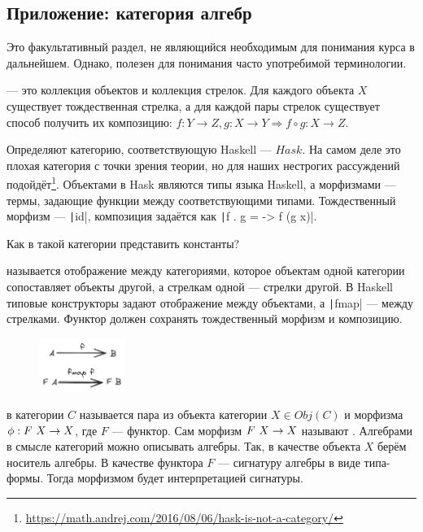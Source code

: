 \subsection{Приложение: категория алгебр} \label{subsec:cats}

Это факультативный раздел, не являющийся необходимым для понимания курса в дальнейшем.
Однако, полезен для понимания часто употребимой терминологии.

 --- это коллекция объектов и коллекция стрелок.
Для каждого объекта $X$ существует тождественная стрелка, а для каждой пары стрелок существует способ получить их композицию: $f : Y \to Z, g : X \to Y \Rightarrow f \circ g : X \to Z$.

Определяют категорию, соответствующую Haskell --- $Hask$.
На самом деле это плохая категория с точки зрения теории, но для наших нестрогих рассуждений подойдёт\footnote{\url{https://math.andrej.com/2016/08/06/hask-is-not-a-category/}}.
Объектами в Hask являются типы языка Haskell, а морфизмами --- термы, задающие функции между соответствующими типами.
Тождественный морфизм --- \texttt|id|, композиция задаётся как \texttt|f . g = \x -> f (g x)|.

\begin{task}
    Как в такой категории представить константы?
\end{task}

 называется отображение между категориями, которое объектам одной категории сопоставляет объекты другой, а стрелкам одной --- стрелки другой.
В Haskell типовые конструкторы задают отображение между объектами, а \texttt|fmap| --- между стрелками.
Функтор должен сохранять тождественный морфизм и композицию.
\begin{figure}[h!]
    \centering
    \includegraphics[width=0.25\textwidth]{figs/functor}
\end{figure}

 в категории $C$ называется пара из объекта категории $X \in Obj(C)$ и морфизма $\phi : F~ X \to X$, где $F$ --- функтор.
Сам морфизм $F~ X \to X$ называют .
Алгебрами в смысле категорий можно описывать алгебры.
Так, в качестве объекта $X$ берём носитель алгебры.
В качестве функтора $F$ --- сигнатуру алгебры в виде типа-формы.
Тогда морфизмом будет интерпретацией сигнатуры.

